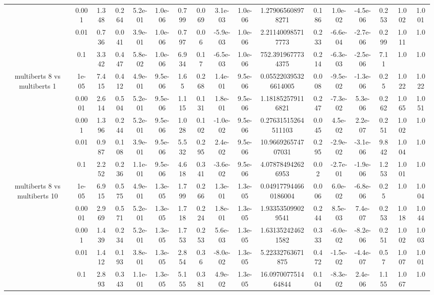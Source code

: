 \begin{tabular}{|c|c|c|c|c|c|c|c|c|c|c|c|c|c|c|c|c|}
 & 0.001 & 1.348 & 0.264 & 5.2e-01 & 1.0e-06 & 0.799 & 0.069 & 3.1e-03 & 1.0e-06 & 1.279065608978271 & 0.186 & 1.0e-02 & -4.5e-06 & 0.253 & 1.002 & 1.001 \\
 & 0.01 & 0.736 & 0.041 & 3.9e-01 & 1.0e-06 & 0.797 & 0.06 & -5.9e-03 & 1.0e-06 & 2.211400985717773 & 0.233 & -6.6e-04 & -2.7e-06 & 0.299 & 1.011 & 1.0 \\
 & 0.1 & 3.342 & 0.447 & 5.8e-02 & 1.0e-06 & 6.934 & 0.17 & -6.5e-03 & 1.0e-06 & 752.3919677734375 & 0.214 & -6.3e-03 & -2.5e-06 & 7.11 & 1.0 & 1.0 \\
\hline
\multirow{5}{*}{multiberts 8 vs multiberts 1} & 1e-05 & 7.415 & 0.412 & 4.9e-01 & 9.5e-06 & 1.65 & 0.268 & 1.4e-01 & 9.5e-06 & 0.055220395326614005 & 0.008 & -9.5e-02 & -1.3e-06 & 0.25 & 1.022 & 1.022 \\
 & 0.0001 & 2.614 & 0.504 & 5.2e-01 & 9.5e-06 & 1.115 & 0.131 & 1.8e-01 & 9.5e-06 & 1.181852579116821 & 0.247 & -7.3e-02 & 5.3e-06 & 0.262 & 1.065 & 1.051 \\
 & 0.001 & 1.396 & 0.244 & 5.2e-01 & 9.5e-06 & 1.028 & 0.102 & -1.0e-02 & 9.5e-06 & 0.27631515264511103 & 0.045 & 4.5e-02 & 2.2e-07 & 0.251 & 1.002 & 1.0 \\
 & 0.01 & 0.987 & 0.108 & 3.9e-01 & 9.5e-06 & 5.532 & 0.295 & 2.4e-02 & 9.5e-06 & 10.966926574707031 & 0.295 & -2.9e-02 & -3.1e-06 & 9.842 & 1.004 & 1.0 \\
 & 0.1 & 2.252 & 0.236 & 1.1e-01 & 9.5e-06 & 4.618 & 0.341 & -3.6e-02 & 9.5e-06 & 4.078784942626953 & 0.02 & -2.7e-01 & -1.9e-06 & 1.253 & 1.001 & 1.0 \\
\hline
\multirow{5}{*}{multiberts 8 vs multiberts 10} & 1e-05 & 6.915 & 0.575 & 4.9e-01 & 1.3e-05 & 1.799 & 0.266 & 1.3e-01 & 1.3e-05 & 0.049177944660186004 & 0.006 & 6.0e-02 & -6.8e-06 & 0.25 & 1.0 & 1.004 \\
 & 0.0001 & 2.969 & 0.571 & 5.2e-01 & 1.3e-05 & 1.718 & 0.224 & 1.8e-01 & 1.3e-05 & 1.933535099029541 & 0.244 & 8.5e-03 & 7.4e-07 & 0.253 & 1.018 & 1.044 \\
 & 0.001 & 1.439 & 0.234 & 5.2e-01 & 1.3e-05 & 1.753 & 0.253 & 5.6e-03 & 1.3e-05 & 1.631352424621582 & 0.333 & -6.0e-02 & -8.2e-06 & 0.251 & 1.002 & 1.003 \\
 & 0.01 & 1.412 & 0.193 & 3.8e-01 & 1.3e-05 & 2.854 & 0.36 & -8.0e-02 & 1.3e-05 & 5.22332763671875 & 0.472 & -1.5e-02 & -4.4e-07 & 0.57 & 1.007 & 1.001 \\
 & 0.1 & 2.893 & 0.343 & 1.1e-01 & 1.3e-05 & 5.155 & 0.381 & 4.9e-02 & 1.3e-05 & 16.097007751464844 & 0.104 & -8.3e-02 & 2.4e-06 & 1.155 & 1.067 & 1.0 \\

\end{tabular}
